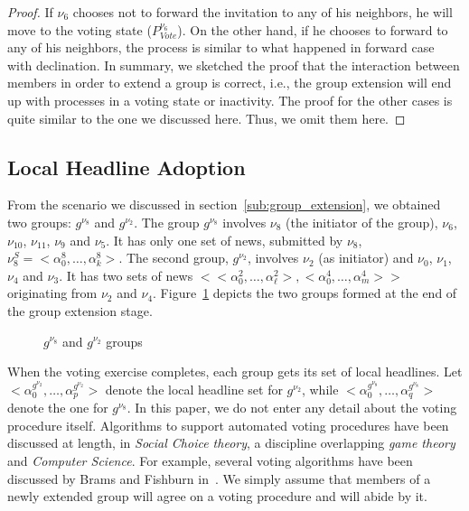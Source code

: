 \begin{proof}
If $\nu_6$ chooses not to forward the invitation to any of his neighbors, he will move to the voting state
($P^{\nu_6}_{Vote}$). On the other hand, if he chooses to forward to any of his neighbors, the process is similar to what
happened in forward case with declination. In summary, we sketched the proof that the interaction between members in
order to extend a group is correct, i.e., the group extension will end up with processes in a voting state or inactivity.
The proof for the other cases is quite similar to the one we discussed here. Thus, we omit them here.
\end{proof}


\subsection{Local Headline Adoption} %
\label{sub:local_headline_adoption}

From the scenario we discussed in section~\ref{sub:group_extension}, we obtained two groups: $g^{\nu_8}$ and $g^{\nu_2}$. The
group $g^{\nu_8}$ involves $\nu_8$ (the initiator of the group), $\nu_6$, $\nu_{10}$, $\nu_{11}$, $\nu_9$ and
$\nu_5$. It has only one set of news, submitted by $\nu_8$, $\nu_8^S=<\alpha_0^8, \ldots,\alpha_k^8>$. The second group,
$g^{\nu_2}$, involves $\nu_2$ (as initiator) and $\nu_0$, $\nu_1$, $\nu_4$ and $\nu_3$. It has two sets of news
$<<\alpha_0^2, \ldots,\alpha_\ell^2>,<\alpha_0^4, \ldots,\alpha_m^4>>$ originating from $\nu_2$ and $\nu_4$.
Figure~\ref{fig:groups} depicts the two groups formed at the end of the group extension stage.
\begin{figure}
	\centering 
	\caption{$g^{\nu_8}$ and $g^{\nu_2}$ groups} 
	\label{fig:groups}
\end{figure}

When the voting exercise completes, each group gets its set of local headlines. Let $<\alpha_0^{g^{\nu_2}}, \ldots,
\alpha_p^{g^{\nu_2}}>$ denote the local headline set for $g^{\nu_2}$, while $<\alpha_0^{g^{\nu_8}}, \ldots,
\alpha_q^{g^{\nu_8}}>$ denote the one for $g^{\nu_8}$. In this paper, we do not enter any detail about the voting
procedure itself. Algorithms to support automated voting procedures have been discussed at length, in \emph{Social Choice
theory}, a discipline overlapping \emph{game theory} and \emph{Computer Science}. For example, several voting algorithms
have been discussed by Brams and Fishburn in~\cite{Brams-Fishburn:04}. We simply assume that members of a newly extended
group will agree on a voting procedure and will abide by it.

